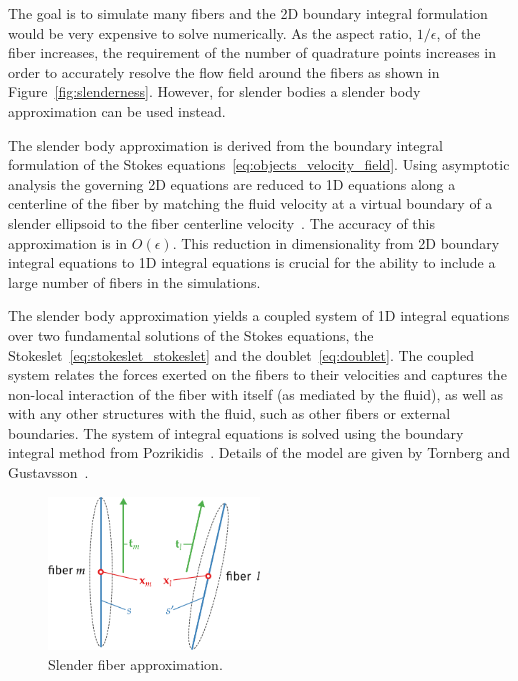 The goal is to simulate many fibers and the 2D boundary integral formulation would be very expensive to solve numerically. As the aspect ratio, $1/\epsilon$, of the fiber increases, the requirement of the number of quadrature points increases in order to accurately resolve the flow field around the fibers as shown in Figure~\ref{fig:slenderness}. However, for slender bodies a slender body approximation can be used instead. 

The slender body approximation is derived from the boundary integral formulation of the Stokes equations~\ref{eq:objects_velocity_field}. Using asymptotic analysis the governing 2D equations are reduced to 1D equations along a centerline of the fiber by matching the fluid velocity at a virtual boundary of a slender ellipsoid to the fiber centerline velocity~\cite{Gotz2000}. The accuracy of this approximation is in $O(\epsilon).$ This reduction in dimensionality from 2D boundary integral equations to 1D integral equations is crucial for the ability to include a large number of fibers in the simulations.

The slender body approximation yields a coupled system of 1D integral equations over two fundamental solutions of the Stokes equations, the Stokeslet~\eqref{eq:stokeslet_stokeslet} and the doublet~\eqref{eq:doublet}. The coupled system relates the forces exerted on the fibers to their velocities and captures the non-local interaction of the fiber with itself (as mediated by the fluid), as well as with any other structures with the fluid, such as other fibers or external boundaries. The system of integral equations is solved using the boundary integral method from Pozrikidis~\cite{Pozrikidis1992}. Details of the model are given by Tornberg and Gustavsson~\cite{Tornberg2006}.

\begin{figure}[!htbp]
  \centering
  \includegraphics[width=0.5\textwidth]{img/slender.pdf}
  \caption{Slender fiber approximation.}
  \label{fig:slender_fiber}
\end{figure}

